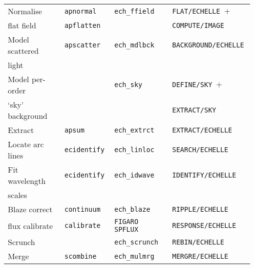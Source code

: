\documentclass[twoside,11pt]{article}
\newenvironment{latexonly}{}{}
\begin{document}
\begin{latexonly}
\begin{table}
\begin{center}
\begin{tabular}{llll}
Normalise          & {\tt apnormal        } & {\tt ech\_ffield   } & {\tt FLAT/ECHELLE $+$   } \\
flat field         & {\tt apflatten       } &                      & {\tt COMPUTE/IMAGE      } \\
Model scattered    & {\tt apscatter       } & {\tt ech\_mdlbck   } & {\tt BACKGROUND/ECHELLE } \\
light              &                        &                      &                           \\
Model per-order    &                        & {\tt ech\_sky      } & {\tt DEFINE/SKY $+$     } \\
`sky' background   &                        &                      & {\tt EXTRACT/SKY        } \\
Extract            & {\tt apsum           } & {\tt ech\_extrct   } & {\tt EXTRACT/ECHELLE    } \\
Locate arc lines   & {\tt ecidentify      } & {\tt ech\_linloc   } & {\tt SEARCH/ECHELLE     } \\
Fit wavelength     & {\tt ecidentify      } & {\tt ech\_idwave   } & {\tt IDENTIFY/ECHELLE   } \\
scales             &                        &                      &                           \\
Blaze correct      & {\tt continuum       } & {\tt ech\_blaze    } & {\tt RIPPLE/ECHELLE     } \\
flux calibrate     & {\tt calibrate       } & {\tt FIGARO SPFLUX } & {\tt RESPONSE/ECHELLE   } \\
Scrunch            &                        & {\tt ech\_scrunch  } & {\tt REBIN/ECHELLE      } \\
Merge              & {\tt scombine        } & {\tt ech\_mulmrg   } & {\tt MERGRE/ECHELLE     } \\
\hline\hline
\end{tabular}
\end{center}
\end{table}
\end{latexonly}
\end{document}

